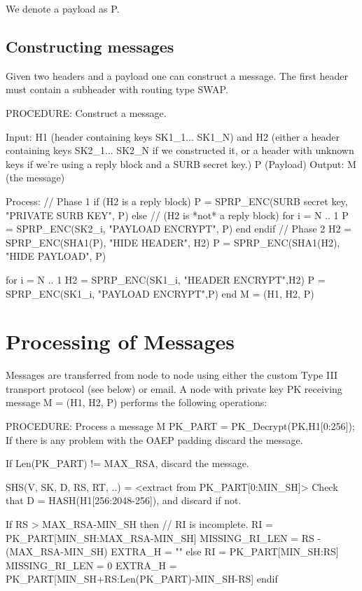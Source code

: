 We denote a payload as P.

\subsection{Constructing messages}

Given two headers and a payload one can construct a
message. The first header must contain a subheader
with routing type SWAP.  

PROCEDURE: Construct a message.

Input: H1 (header containing keys SK1_1... SK1_N)
       and H2 (either a header containing keys SK2_1... SK2_N if
         we constructed it, or a header with unknown keys if we're
         using a reply block and a SURB secret key.)
       P (Payload)
Output: M (the message)

Process:
        // Phase 1
        if (H2 is a reply block)
                P = SPRP_ENC(SURB secret key, "PRIVATE SURB KEY", P)
        else // (H2 is *not* a reply block)
                for i = N .. 1
                        P = SPRP_ENC(SK2_i, "PAYLOAD ENCRYPT", P)
                end
        endif
        // Phase 2
        H2 = SPRP_ENC(SHA1(P), "HIDE HEADER", H2)
        P = SPRP_ENC(SHA1(H2), "HIDE PAYLOAD", P)

        for i = N .. 1
                H2 = SPRP_ENC(SK1_i, "HEADER ENCRYPT",H2)
                P = SPRP_ENC(SK1_i, "PAYLOAD ENCRYPT",P)
        end
        M = (H1, H2, P)

\section{Processing of Messages}

Messages are transferred from node to node using either the custom Type
III transport protocol (see below) or email.  A node with private key
PK receiving message M = (H1, H2, P) performs the following operations:

PROCEDURE: Process a message M
        PK_PART = PK_Decrypt(PK,H1[0:256]);
        If there is any problem with the OAEP padding discard the message.

        If Len(PK_PART) != MAX_RSA, discard the message.

        SHS(V, SK, D, RS, RT, ..) = <extract from PK_PART[0:MIN_SH]>
        Check that D = HASH(H1[256:2048-256]), and discard if not.

        If RS > MAX_RSA-MIN_SH then 
            // RI is incomplete.
            RI = PK_PART[MIN_SH:MAX_RSA-MIN_SH]
            MISSING_RI_LEN = RS - (MAX_RSA-MIN_SH)
            EXTRA_H = ""
        else
            RI = PK_PART[MIN_SH:RS]
            MISSING_RI_LEN = 0
            EXTRA_H = PK_PART[MIN_SH+RS:Len(PK_PART)-MIN_SH-RS]
        endif

